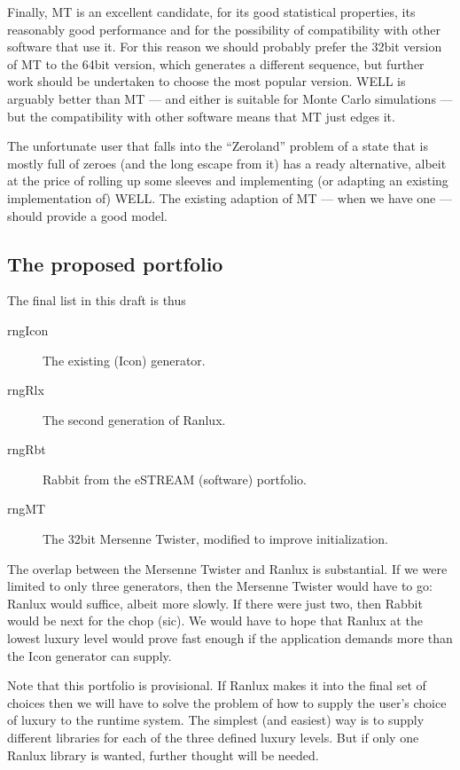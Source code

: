 \documentclass[letterpaper,12pt]{article}
\begin{document}
Finally, MT is an excellent candidate, for its good statistical
properties, its reasonably good performance and for the possibility of
compatibility with other software that use it.  For this reason we should
probably prefer the 32bit version of MT to the 64bit version, which
generates a different sequence, but further work should be undertaken to
choose the most popular version. WELL is arguably better than MT --- and
either is suitable for Monte Carlo simulations --- but the compatibility
with other software means that MT just edges it.

The unfortunate user that falls into the ``Zeroland'' problem of a state
that is mostly full of zeroes (and the long escape from it) has a ready
alternative, albeit at the price of rolling up some sleeves and
implementing (or adapting an existing implementation of) WELL. The existing
adaption of MT --- when we have one --- should provide a good model.

\subsection{The proposed portfolio}
The final list in this draft is thus
\begin{description}
\item[{\sf rngIcon}]
  The existing (Icon) generator.
\item[{\sf rngRlx}]
  The second generation of Ranlux\cite{Luscher:Ranlux2}.
\item[{\sf rngRbt}]
  Rabbit from the eSTREAM (software) portfolio\cite{eStream}.
\item[{\sf rngMT}]
  The 32bit Mersenne Twister, modified to improve initialization\cite{ImprovedMT}.
\end{description}

The overlap between the Mersenne Twister and Ranlux is substantial. If
we were limited to only three generators, then the Mersenne Twister would have
to go: Ranlux would suffice, albeit more slowly.  If there were just two,
then Rabbit would be next for the chop (sic). We would have to hope that
Ranlux at the lowest luxury level would prove fast enough if the
application demands more than the Icon generator can supply.

Note that this portfolio is provisional. If Ranlux makes it into the final
set of choices then we will have to solve the problem of how to supply the
user's choice of luxury to the runtime system. The simplest (and easiest)
way is to supply different libraries for each of the three defined luxury
levels. But if only one Ranlux library is wanted, further thought will be
needed.
\end{document}

